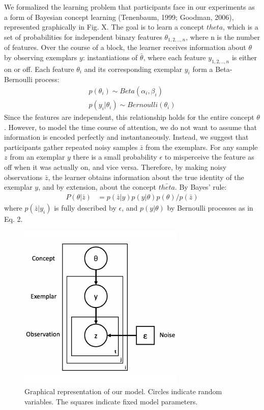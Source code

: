 \documentclass[10pt, letterpaper]{article}
\newenvironment{CodeChunk}{}{}
\begin{document}
We formalized the learning problem that participants face in our
experiments as a form of Bayesian concept learning (Tenenbaum, 1999;
Goodman, 2006), represented graphically in Fig. X. The goal is to learn
a concept \(theta\), which is a set of probabilities for independent
binary features \(\theta_{1,2,..,n}\), where n is the number of
features. Over the course of a block, the learner receives information
about \(\theta\) by observing exemplars \(y\): instantiations of
\(\bar{\theta}\), where each feature \(y_{1,2,..,n}\) is either on or
off. Each feature \(\theta_i\) and its corresponding exemplar \(y_i\)
form a Beta-Bernoulli process: \begin{eqnarray}
p(\theta_i) \sim Beta(\alpha_i,\beta_i) \\
p(y_i|\theta_i) \sim Bernoulli(\theta_i)
\end{eqnarray} Since the features are independent, this relationship
holds for the entire concept \(\theta\). However, to model the time
course of attention, we do not want to assume that information is
encoded perfectly and instantaneously. Instead, we suggest that
participants gather repeated noisy samples \(\bar{z}\) from the
exemplars. For any sample \(z\) from an exemplar \(y\) there is a small
probability \(\epsilon\) to misperceive the feature as off when it was
actually on, and vice versa. Therefore, by making noisy observations
\(\bar{z}\), the learner obtains information about the true identity of
the exemplar \(y\), and by extension, about the concept \(\bar{theta}\).
By Bayes' rule: \begin{eqnarray}
P(\theta|\bar{z}) &= p(\bar{z}|y) p(y|\theta) p(\theta) / p(\bar{z})
\end{eqnarray} where \(p(\bar{z}|y_i)\) is fully described by
\(\epsilon\), and \(p(y|\theta)\) by Bernoulli processes as in Eq. 2.

\begin{CodeChunk}
\begin{figure}[H]

{\centering \includegraphics{figs/image-1} 

}

\caption[Graphical representation of our model]{Graphical representation of our model. Circles indicate random variables. The squares indicate fixed model parameters.}\label{fig:image}
\end{figure}
\end{CodeChunk}
\end{document}
